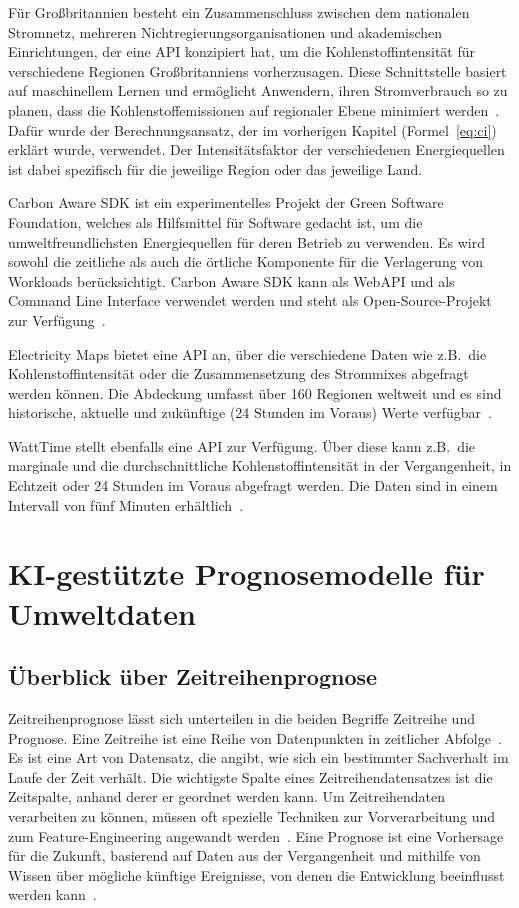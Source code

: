 Für Großbritannien besteht ein Zusammenschluss zwischen dem nationalen Stromnetz, mehreren Nichtregierungsorganisationen und akademischen Einrichtungen, der eine API konzipiert hat, um die Kohlenstoffintensität für verschiedene Regionen Großbritanniens vorherzusagen.
Diese Schnittstelle basiert auf maschinellem Lernen und ermöglicht Anwendern, ihren Stromverbrauch so zu planen, dass die Kohlenstoffemissionen auf regionaler Ebene minimiert werden~\cite{Currie.2024}.
Dafür wurde der Berechnungsansatz, der im vorherigen Kapitel (Formel~\ref{eq:ci}) erklärt wurde, verwendet.
Der Intensitätsfaktor der verschiedenen Energiequellen ist dabei spezifisch für die jeweilige Region oder das jeweilige Land.

Carbon Aware SDK ist ein experimentelles Projekt der Green Software Foundation, welches als Hilfsmittel für Software gedacht ist, um die umweltfreundlichsten Energiequellen für deren Betrieb zu verwenden.
Es wird sowohl die zeitliche als auch die örtliche Komponente für die Verlagerung von Workloads berücksichtigt.
Carbon Aware SDK kann als WebAPI und als Command Line Interface verwendet werden und steht als Open-Source-Projekt zur Verfügung~\cite{GreenSoftwareFoundation.20231212T09:58:27.000Z}.

Electricity Maps bietet eine API an, über die verschiedene Daten wie z.B.\ die Kohlenstoffintensität oder die Zusammensetzung des Strommixes abgefragt werden können.
Die Abdeckung umfasst über 160 Regionen weltweit und es sind historische, aktuelle und zukünftige (24 Stunden im Voraus) Werte verfügbar~\cite{ElectricityMaps.20231220T09:16:49.000Z}.

WattTime stellt ebenfalls eine API zur Verfügung.
Über diese kann z.B.\ die marginale und die durchschnittliche Kohlenstoffintensität in der Vergangenheit, in Echtzeit oder 24 Stunden im Voraus abgefragt werden.
Die Daten sind in einem Intervall von fünf Minuten erhältlich~\cite{WattTime.20231130T19:28:06+00:00}.

\section{KI-gestützte Prognosemodelle für Umweltdaten}
\subsection{Überblick über Zeitreihenprognose}
Zeitreihenprognose lässt sich unterteilen in die beiden Begriffe Zeitreihe und Prognose.
Eine Zeitreihe ist eine Reihe von Datenpunkten in zeitlicher Abfolge~\cite{Peixeiro.2022}.
Es ist eine Art von Datensatz, die angibt, wie sich ein bestimmter Sachverhalt im Laufe der Zeit verhält.
Die wichtigste Spalte eines Zeitreihendatensatzes ist die Zeitspalte, anhand derer er geordnet werden kann.
Um Zeitreihendaten verarbeiten zu können, müssen oft spezielle Techniken zur Vorverarbeitung und zum Feature-Engineering angewandt werden~\cite{Lazzeri.2021}.
Eine Prognose ist eine Vorhersage für die Zukunft, basierend auf Daten aus der Vergangenheit und mithilfe von Wissen über mögliche künftige Ereignisse, von denen die Entwicklung beeinflusst werden kann~\cite{Peixeiro.2022}.

